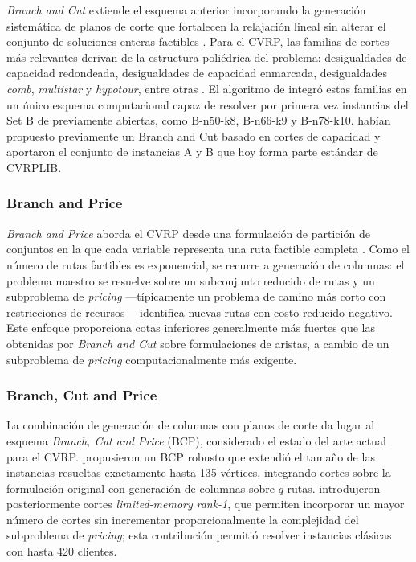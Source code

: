 \textit{Branch and Cut} extiende el esquema anterior incorporando la generación
sistemática de planos de corte que fortalecen la relajación lineal sin alterar el
conjunto de soluciones enteras factibles \parencite{naddef2002branch}. Para el CVRP, las
familias de cortes más relevantes derivan de la estructura poliédrica del problema:
desigualdades de capacidad redondeada, desigualdades de capacidad enmarcada,
desigualdades \textit{comb}, \textit{multistar} y \textit{hypotour}, entre otras
\parencite{naddef1991branch}. El algoritmo de \textcite{lysgaard2004branch} integró estas
familias en un único esquema computacional capaz de resolver por primera vez instancias
del Set B de \textcite{augerat1995} previamente abiertas, como B-n50-k8, B-n66-k9 y
B-n78-k10. \textcite{augerat1995} habían propuesto previamente un Branch and Cut basado
en cortes de capacidad y aportaron el conjunto de instancias A y B que hoy forma parte
estándar de CVRPLIB.

\subsubsection{Branch and Price}

\textit{Branch and Price} aborda el CVRP desde una formulación de partición de conjuntos
en la que cada variable representa una ruta factible completa
\parencite{tan2021vehicle}. Como el número de rutas factibles es exponencial, se recurre
a generación de columnas: el problema maestro se resuelve sobre un subconjunto reducido
de rutas y un subproblema de \textit{pricing} —típicamente un problema de camino más
corto con restricciones de recursos— identifica nuevas rutas con costo reducido
negativo. Este enfoque proporciona cotas inferiores generalmente más fuertes que las
obtenidas por \textit{Branch and Cut} sobre formulaciones de aristas, a cambio de un
subproblema de \textit{pricing} computacionalmente más exigente.

\subsubsection{Branch, Cut and Price}

La combinación de generación de columnas con planos de corte da lugar al esquema
\textit{Branch, Cut and Price} (BCP), considerado el estado del arte actual para el
CVRP. \textcite{fukasawa2006robust} propusieron un BCP robusto que extendió el tamaño
de las instancias resueltas exactamente hasta 135 vértices, integrando cortes sobre la
formulación original con generación de columnas sobre $q$-rutas.
\textcite{pecin2017improved} introdujeron posteriormente cortes \textit{limited-memory}
\textit{rank-1}, que permiten incorporar un mayor número de cortes sin incrementar
proporcionalmente la complejidad del subproblema de \textit{pricing}; esta contribución
permitió resolver instancias clásicas con hasta 420 clientes.

